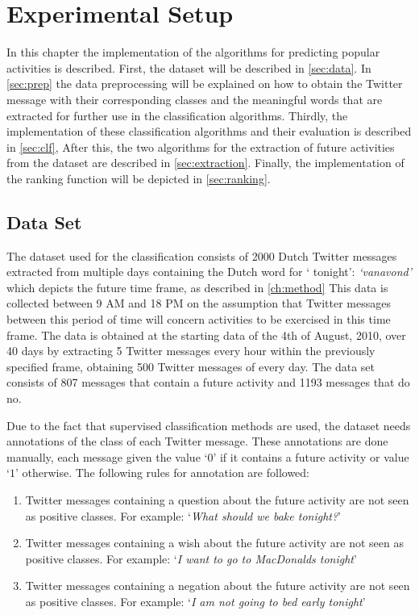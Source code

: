 \chapter{Experimental Setup} %
\label{ch:impl} %
In this chapter the implementation of the algorithms for predicting popular activities is described. 
\iffalse
First, the dataset will be described in \autoref{sec:data}. In \autoref{sec:prep} the data preprocessing will be explained on how to obtain the Twitter message with their corresponding classes and the meaningful words that are extracted for further use in the classification algorithms. Thirdly, the implementation of these classification algorithms and their evaluation is described in \autoref{sec:clf}, After this, the two algorithms for the extraction of future activities from the dataset are described in \autoref{sec:extraction}. Finally, the implementation of the ranking function will be depicted in \autoref{sec:ranking}.

\section{Data Set}\label{sec:data}
The dataset used for the classification consists of 2000 Dutch Twitter messages extracted from multiple days containing the Dutch word for ` tonight': \textit{`vanavond'} which depicts the future time frame, as described in \autoref{ch:method} This data is collected between 9 AM and 18 PM on the assumption that Twitter messages between this period of time will concern activities to be exercised in this time frame. The data is obtained at the starting data of the 4th of August, 2010, over 40 days by extracting 5 Twitter messages every hour within the previously specified frame, obtaining 500 Twitter messages of every day. The data set consists of 807 messages that contain a future activity and 1193 messages that do no.

Due to the fact that supervised classification methods are used, the dataset needs annotations of the class of each Twitter message. These annotations are done manually, each message given the value `$0$' if it contains a future activity or value `$1$' otherwise. The following rules for annotation are followed:
\begin{enumerate}
\item Twitter messages containing a question about the future activity are not seen as positive classes. For example: `\textit{What should we bake tonight?}'
\item Twitter messages containing a wish about the future activity are not seen as positive classes. For example: `\textit{I want to go to MacDonalds tonight}'
\item Twitter messages containing a negation about the future activity are not seen as positive classes. For example: `\textit{I am not going to bed early tonight}'
\end{enumerate}



